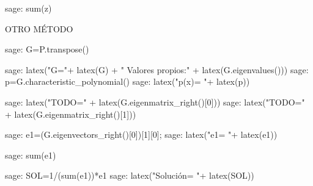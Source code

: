\begin{sagecommandline}
    sage: sum(z)
\end{sagecommandline}
    
\par OTRO MÉTODO
    
\begin{sagecommandline}
    sage: G=P.transpose()
\end{sagecommandline}
    
\begin{sagecommandline}
    sage: latex("G="+ latex(G) + " Valores propios:" + latex(G.eigenvalues()))
    sage: p=G.characteristic_polynomial()
    sage: latex("p(x)=  "+ latex(p))
\end{sagecommandline}
    
\begin{sagecommandline}
    sage: latex("TODO=" + latex(G.eigenmatrix_right()[0]))
    sage: latex("TODO=" + latex(G.eigenmatrix_right()[1]))
\end{sagecommandline}
    
\begin{sagecommandline}
    sage: e1=(G.eigenvectors_right()[0])[1][0];
    sage: latex("e1=  "+ latex(e1))
\end{sagecommandline}
    
\begin{sagecommandline}
    sage: sum(e1)
\end{sagecommandline}
    
\begin{sagecommandline}
    sage: SOL=1/(sum(e1))*e1
    sage: latex("Solución=  "+ latex(SOL))
\end{sagecommandline}